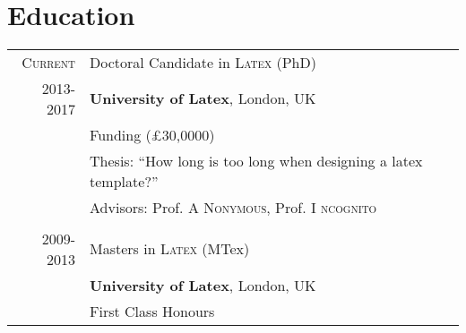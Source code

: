 \documentclass[a4paper,10pt]{article}
\begin{document}

\hfill
\begin{minipage}[t]{2.95in}
 \flushright {\footnotesize 
 \href{\mydepartmentemail}{\mydepartment} \\ \myaddrone \\ \myaddrtwo \\ }
\end{minipage}
%
\begin{minipage}[t]{1.3in}
  \flushright \footnotesize  \myphone \, \faPhone  \\ 
  {\scriptsize  \texttt{\href{mailto:\myemail}{\myemail}} \, \faEnvelope} \\
  {\scriptsize  \texttt{\href{\myweb}{\myweb}} \, \faGlobe}
\end{minipage}

\medskip


\noindent{\fontsize{40}{50}\selectfont \textsc{\myauthor}}


\section{Education}

\begin{tabular}{r|p{15cm}}	
%
\textsc{Current} 	& Doctoral Candidate in \textsc{Latex} (PhD) \\
2013-2017 			& \textbf{University of Latex}, London, UK \\
					& Funding (£30,0000) \\
					& Thesis: ``How long is too long when designing a latex template?'' \\ 
					& \small Advisors: Prof. A \textsc{Nonymous}, Prof. I \textsc{ncognito} \\ 
%
\multicolumn{2}{c}{} \\
2009-2013 			& Masters in \textsc{Latex} (MTex) \\
					& \textbf{University of Latex}, London, UK\\
					& First Class Honours\\
%
\end{tabular}

\end{document}
